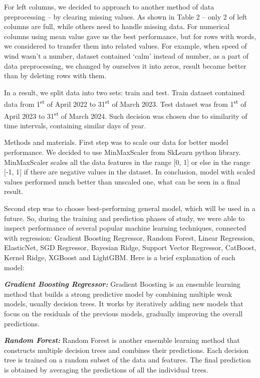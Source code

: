 \begin{multicols}{2}
For left columns, we decided to approach to another method of data
preprocessing -- by clearing missing values. As shown in Table 2 -- only
2 of left columns are full, while others need to handle missing data.
For numerical columns using mean value gave us the best performance, but
for rows with words, we considered to transfer them into related values.
For example, when speed of wind wasn't a number, dataset contained
`calm' instead of number, as a part of data preprocessing, we changed by
ourselves it into zeros, result became better than by deleting rows with
them.

In a result, we split data into two sets: train and test. Train dataset
contained data from 1\textsuperscript{st} of April 2022 to
31\textsuperscript{st} of March 2023. Test dataset was from
1\textsuperscript{st} of April 2023 to 31\textsuperscript{st} of March
2024. Such decision was chosen due to similarity of time intervals,
containing similar days of year.


Methods and materials. First step was to scale our data for better model
performance. We decided to use MinMaxScaler from SkLearn python library.
MinMaxScaler scales all the data features in the range {[}0, 1{]} or
else in the range {[}-1, 1{]} if there are negative values in the
dataset. In conclusion, model with scaled values performed much better
than unscaled one, what can be seen in a final result.


Second step was to choose best-performing general model, which will be
used in a future. So, during the training and prediction phases of
study, we were able to inspect performance of several popular machine
learning techniques, connected with regression: Gradient Boosting
Regressor, Random Forest, Linear Regression, ElasticNet, SGD Regressor,
Bayesian Ridge, Support Vector Regressor, CatBoost, Kernel Ridge,
XGBoost and LightGBM. Here is a brief explanation of each model:

\emph{{\bfseries Gradient Boosting Regressor:}} Gradient Boosting is an
ensemble learning method that builds a strong predictive model by
combining multiple weak models, usually decision trees. It works by
iteratively adding new models that focus on the residuals of the
previous models, gradually improving the overall predictions.

\emph{{\bfseries Random Forest:}} Random Forest is another ensemble
learning method that constructs multiple decision trees and combines
their predictions. Each decision tree is trained on a random subset of
the data and features. The final prediction is obtained by averaging the
predictions of all the individual trees.


\end{multicols}
